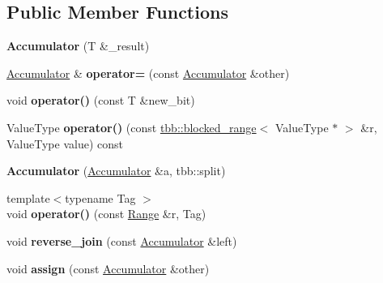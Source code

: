 \subsection*{Public Member Functions}
\begin{DoxyCompactItemize}
\item 
\hypertarget{classAccumulator_a3fa2cd5634da6f08baeaac2a51ca8167}{}{\bfseries Accumulator} (T \&\+\_\+result)\label{classAccumulator_a3fa2cd5634da6f08baeaac2a51ca8167}

\item 
\hypertarget{classAccumulator_aabc97409d09f326da2f1c2d4c00a5803}{}\hyperlink{classAccumulator}{Accumulator} \& {\bfseries operator=} (const \hyperlink{classAccumulator}{Accumulator} \&other)\label{classAccumulator_aabc97409d09f326da2f1c2d4c00a5803}

\item 
\hypertarget{classAccumulator_a29993c38ac1386e4fb35bc812707ccc4}{}void {\bfseries operator()} (const T \&new\+\_\+bit)\label{classAccumulator_a29993c38ac1386e4fb35bc812707ccc4}

\item 
\hypertarget{classAccumulator_a53deef32ca68854d3205c0e78103b1ae}{}Value\+Type {\bfseries operator()} (const \hyperlink{classtbb_1_1blocked__range}{tbb\+::blocked\+\_\+range}$<$ Value\+Type $\ast$ $>$ \&r, Value\+Type value) const \label{classAccumulator_a53deef32ca68854d3205c0e78103b1ae}

\item 
\hypertarget{classAccumulator_ac2893584d85c1a402445a2595b88e38c}{}{\bfseries Accumulator} (\hyperlink{classAccumulator}{Accumulator} \&a, tbb\+::split)\label{classAccumulator_ac2893584d85c1a402445a2595b88e38c}

\item 
\hypertarget{classAccumulator_a1f8cf370476eaeedc222d292f4a85423}{}{\footnotesize template$<$typename Tag $>$ }\\void {\bfseries operator()} (const \hyperlink{classtbb_1_1blocked__range}{Range} \&r, Tag)\label{classAccumulator_a1f8cf370476eaeedc222d292f4a85423}

\item 
\hypertarget{classAccumulator_ada15be755f7700cd672716181719cdff}{}void {\bfseries reverse\+\_\+join} (const \hyperlink{classAccumulator}{Accumulator} \&left)\label{classAccumulator_ada15be755f7700cd672716181719cdff}

\item 
\hypertarget{classAccumulator_aeee26644f24187a1a793811dfad96e51}{}void {\bfseries assign} (const \hyperlink{classAccumulator}{Accumulator} \&other)\label{classAccumulator_aeee26644f24187a1a793811dfad96e51}

\end{DoxyCompactItemize}

